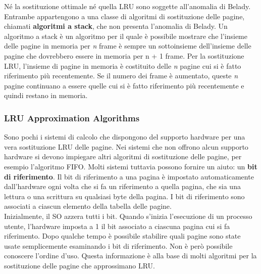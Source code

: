 \documentclass{article}
\begin{document}
				Né la sostituzione ottimale né quella LRU sono soggette all’anomalia di Belady. Entrambe appartengono a una classe di algoritmi di sostituzione delle pagine, chiamati \textbf{algoritmi a stack}, che non presenta l’anomalia di Belady. Un algoritmo a stack è un algoritmo per il quale è possibile mostrare che l’insieme delle pagine in memoria per \textit{n} frame è sempre un sottoinsieme dell’insieme delle pagine che dovrebbero essere in memoria per n + 1 frame. Per la sostituzione LRU, l’insieme di pagine in memoria è costituito delle \textit{n} pagine cui si è fatto riferimento più recentemente. Se il numero dei frame è aumentato, queste \textit{n} pagine continuano a essere quelle cui si è fatto riferimento più recentemente e quindi restano in memoria.

			\subsubsection{LRU Approximation Algorithms}
				Sono pochi i sistemi di calcolo che dispongono del supporto hardware per una vera sostituzione LRU delle pagine. Nei sistemi che non offrono alcun supporto hardware si devono impiegare altri algoritmi di sostituzione delle pagine, per esempio l’algoritmo FIFO. Molti sistemi tuttavia possono fornire un aiuto: un \textbf{bit di riferimento}. Il bit di riferimento a una pagina è impostato automaticamente dall’hardware ogni volta che si fa un riferimento a quella pagina, che sia una lettura o una scrittura su qualsiasi byte della pagina. I bit di riferimento sono associati a ciascun elemento della tabella delle pagine.
				\\Inizialmente, il SO azzera tutti i bit. Quando s’inizia l’esecuzione di un processo utente, l’hardware imposta a 1 il bit associato a ciascuna pagina cui si fa riferimento. Dopo qualche tempo è possibile stabilire quali pagine sono state usate semplicemente esaminando i bit di riferimento. Non è però possibile conoscere l’ordine d’uso. Questa informazione è alla base di molti algoritmi per la sostituzione delle pagine che approssimano LRU.
\end{document}
